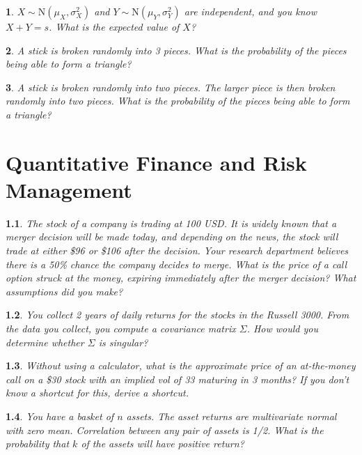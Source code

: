 \documentclass{report}
\newtheorem{problem}{}
\numberwithin{problem}{chapter} %
\begin{document}
\begin{problem}
$X \sim \mbox{N}(\mu_X, \sigma^2_X)$ and $Y \sim \mbox{N}(\mu_Y, \sigma^2_Y)$ are independent, and you know $X+Y=s$. What is the expected value of $X$? 
\end{problem}

\begin{problem}
A stick is broken randomly into 3 pieces. What is the probability of the pieces being able to form a triangle?
\end{problem}

\begin{problem}
A stick is broken randomly into two pieces. The larger piece is then broken randomly into two pieces. What is the probability of the pieces being able to form a triangle?
\end{problem}


\chapter{Quantitative Finance and Risk Management}

\begin{problem}
The stock of a company is trading at 100 USD. It is widely known that a merger decision will be made today, and depending on the news, the stock will trade at either \$96 or \$106 after the decision. Your research department believes there is a 50\% chance
        the company decides to merge. What is the price of a call option struck at the money, expiring immediately after the merger decision? What assumptions did you make?
\end{problem}

\begin{problem}
You collect 2 years of daily returns for the stocks in the Russell 3000. From the data you collect, you compute a covariance matrix $\Sigma$. How would you determine whether $\Sigma$ is singular?
\end{problem}

\begin{problem}
Without using a calculator, what is the approximate price of an at-the-money call on a \$30 stock with an implied vol of 33 maturing in 3 months? If you don't know a shortcut for this, derive a shortcut.
\end{problem}

\begin{problem}
You have a basket of $n$ assets. The asset returns are multivariate normal with zero mean. Correlation between any pair of assets is 1/2. What is the probability that $k$ of the assets will have positive return?
\end{problem}
\end{document}
